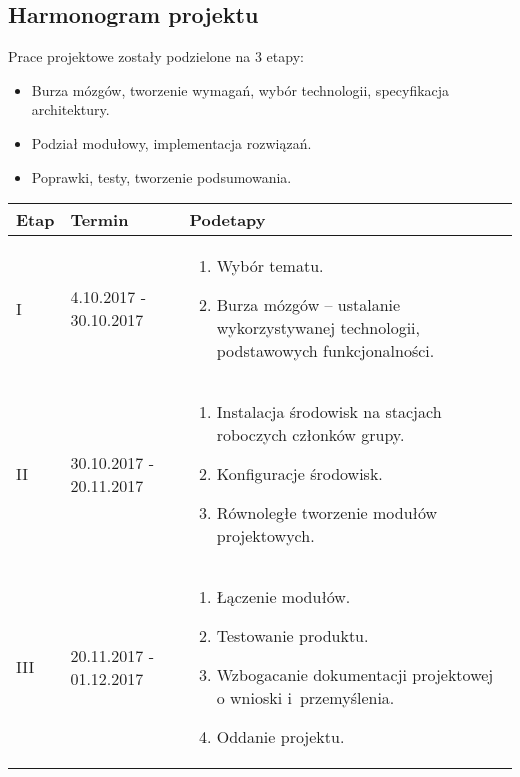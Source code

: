 \subsection{Harmonogram projektu}

Prace projektowe zostały podzielone na 3 etapy:
\begin{itemize}
	\item Burza mózgów, tworzenie wymagań, wybór technologii, specyfikacja architektury. 
	\item Podział modułowy, implementacja rozwiązań.
	\item Poprawki, testy, tworzenie podsumowania.
\end{itemize}

\begin{tabularx}{\textwidth}{|p{1cm}|p{4cm}|p{9.68cm}|}
	\hline
	Etap & Termin & Podetapy \tabularnewline \hline
	I & 4.10.2017 - 30.10.2017 &
		\begin{enumerate}
			\item Wybór tematu.
			\item Burza mózgów – ustalanie wykorzystywanej technologii, podstawowych funkcjonalności. 
		\end{enumerate}
		\tabularnewline \hline
	II & 30.10.2017 - 20.11.2017 &
		\begin{enumerate}
			\item Instalacja środowisk na stacjach roboczych członków grupy.
			\item Konfiguracje środowisk.
			\item Równoległe tworzenie modułów projektowych.
		\end{enumerate}
	\tabularnewline \hline
	III & 20.11.2017 - 01.12.2017 &
		\begin{enumerate}
			\item Łączenie modułów.
			\item Testowanie produktu.
			\item Wzbogacanie dokumentacji projektowej o wnioski i~przemyślenia.
			\item Oddanie projektu.
		\end{enumerate}
	\tabularnewline \hline
\end{tabularx}
